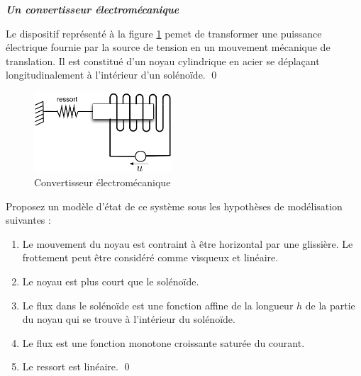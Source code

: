 \begin{exercice}{\bf \em Un convertisseur électromécanique}

Le dispositif représenté à la figure \ref{fig:convem} pemet de transformer une
puissance
électrique fournie par la source de tension en un mouvement mécanique de translation.  Il
est constitué d'un noyau cylindrique en acier se déplaçant longitudinalement à
l'intérieur d'un solénoïde. \qed
\begin{figure}[htbp]
\begin{center}
\includegraphics[height=3cm]{convem}
\caption{Convertisseur électromécanique}
\label{fig:convem}
\end{center}
\end{figure}

Proposez un modèle d'état de ce système sous les hypothèses de modélisation
suivantes :
\begin{enumerate}
\item Le mouvement du noyau est contraint à être horizontal par une glissière.  Le
frottement peut être considéré comme visqueux et linéaire.
\item Le noyau est plus court que le solénoïde.
\item Le flux dans le solénoïde est une fonction affine de la longueur $h$ de la partie du
noyau qui se trouve à l'intérieur du solénoïde.
\item Le flux est une fonction monotone croissante saturée du courant.
\item Le ressort est linéaire. \qed
\end{enumerate}
\end{exercice}

